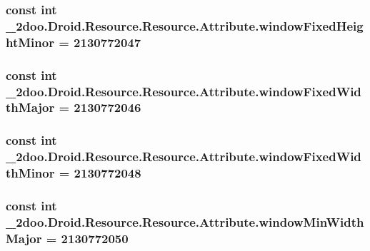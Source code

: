 \hypertarget{class__2doo_1_1_droid_1_1_resource_1_1_attribute_2cb92505465ee540e1e85de3f9637ee7}{
\subsubsection[{windowFixedHeightMinor}]{\setlength{\rightskip}{0pt plus 5cm}const int \_\-2doo.Droid.Resource.Resource.Attribute.windowFixedHeightMinor = 2130772047}}
\label{class__2doo_1_1_droid_1_1_resource_1_1_attribute_2cb92505465ee540e1e85de3f9637ee7}


\hypertarget{class__2doo_1_1_droid_1_1_resource_1_1_attribute_82cbbef46a65bca3a6feb45ad40d35f5}{
\subsubsection[{windowFixedWidthMajor}]{\setlength{\rightskip}{0pt plus 5cm}const int \_\-2doo.Droid.Resource.Resource.Attribute.windowFixedWidthMajor = 2130772046}}
\label{class__2doo_1_1_droid_1_1_resource_1_1_attribute_82cbbef46a65bca3a6feb45ad40d35f5}


\hypertarget{class__2doo_1_1_droid_1_1_resource_1_1_attribute_34f0fd910ac5f57e3ed8f46759994280}{
\subsubsection[{windowFixedWidthMinor}]{\setlength{\rightskip}{0pt plus 5cm}const int \_\-2doo.Droid.Resource.Resource.Attribute.windowFixedWidthMinor = 2130772048}}
\label{class__2doo_1_1_droid_1_1_resource_1_1_attribute_34f0fd910ac5f57e3ed8f46759994280}


\hypertarget{class__2doo_1_1_droid_1_1_resource_1_1_attribute_562a9fc407193ab45d41636464a0c313}{
\subsubsection[{windowMinWidthMajor}]{\setlength{\rightskip}{0pt plus 5cm}const int \_\-2doo.Droid.Resource.Resource.Attribute.windowMinWidthMajor = 2130772050}}
\label{class__2doo_1_1_droid_1_1_resource_1_1_attribute_562a9fc407193ab45d41636464a0c313}


